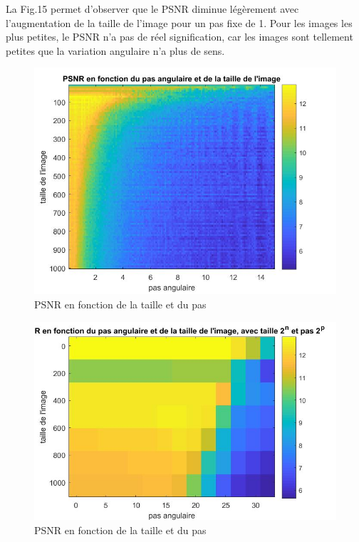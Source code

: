 \documentclass[conference]{IEEEtran}
\begin{document}
La Fig.15 permet d'observer que le PSNR diminue légèrement avec l'augmentation de la taille de l'image pour un pas fixe de 1. Pour les images les plus petites, le PSNR n'a pas de réel signification, car les images sont tellement petites que la variation angulaire n'a plus de sens.

\begin{figure}[H]
\centering
\includegraphics[scale=0.38]{fig2}
	\caption[PSNR en fonction de la taille et du pas]{PSNR en fonction de la taille et du pas}
\label{fig:gallery}
\end{figure}

\begin{figure}[H]
\centering
\includegraphics[scale=0.38]{fig4}
	\caption[PSNR en fonction de la taille et du pas]{PSNR en fonction de la taille et du pas}
\label{fig:gallery}
\end{figure}
\end{document}
